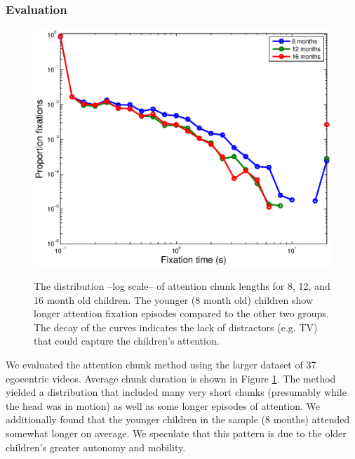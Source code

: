 \documentclass[10pt,letterpaper]{article}
\begin{document}
\subsubsection{Evaluation}

\begin{figure}[t]
\begin{center}
           \includegraphics[width=1\linewidth]{Image/attention.eps}    \label{fig:buckets}
\caption{The distribution --log scale-- of attention chunk lengths for 8, 12, and 16 month old children. The younger (8 month old) children show longer attention fixation episodes compared to the other two groups. The decay of the curves indicates the lack of distractors (e.g. TV) that could capture the children's attention.}
\label{fig:chunks}
\end{center}
\end{figure}

We evaluated the attention chunk method using the larger dataset of 37 egocentric videos. Average chunk duration is shown in Figure \ref{fig:chunks}. The method yielded a distribution that included many very short chunks (presumably while the head was in motion) as well as some longer episodes of attention. We additionally found that the younger children in the sample (8 months) attended somewhat longer on average. We speculate that this pattern is due to the older children's greater autonomy and mobility. 
\end{document}
